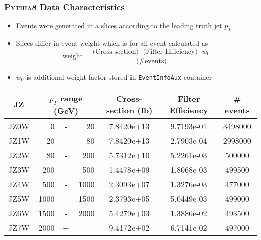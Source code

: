 \documentclass[compress]{beamer}
\newcommand{\pt}{p_{T}}
\begin{document}
\begin{frame}
\frametitle{\textsc{Pythia8} Data Characteristics}
\begin{itemize}
  \item Events were generated in a slices according to the leading truth
      jet $\pt$.
  \item Slices differ in event weight which is for all event calculated as
  \begin{equation*}
    \text{weight} = \frac{\text{(Cross-section)} \cdot \text{(Filter
      Efficiency)} \cdot w_0}{\text{(\# events)}} 
    \end{equation*}
  \item $w_0$ is additional weight factor stored in \texttt{EventInfoAux}
    container
\end{itemize}
  \small
  \begin{table}
  \centering
  \begin{tabular}{|c|rcr|c|c|c|}
    \hline 
     JZ & \multicolumn{3}{|c|}{$\pt$ range (GeV)} & Cross-section (fb) & Filter Efficiency & \# events  \\ 
    \hline
    \hline
		 JZ0W &     0 & - &    20 & 7.8420e+13 & 9.7193e-01 & 3498000 \\ 
    \hline
		 JZ1W &    20 & - &    80 & 7.8420e+13 & 2.7903e-04 & 2998000 \\
    \hline
		 JZ2W &    80 & - &   200 & 5.7312e+10 & 5.2261e-03 & 500000  \\
    \hline
		 JZ3W &   200 & - &   500 & 1.4478e+09 & 1.8068e-03 & 499500  \\
    \hline
		 JZ4W &   500 & - &  1000 & 2.3093e+07 & 1.3276e-03 & 477000  \\
    \hline
		 JZ5W &  1000 & - &  1500 & 2.3793e+05 & 5.0449e-03 & 499000  \\
    \hline
		 JZ6W &  1500 & - &  2000 & 5.4279e+03 & 1.3886e-02 & 493500  \\
    \hline
		 JZ7W &  2000 & + &       & 9.4172e+02 & 6.7141e-02 & 497000  \\
    \hline 
  \end{tabular}
\end{table}
\normalsize
\end{frame}

\begin{frame}
\frametitle{$\pt$ spectra of Truth Jets}
  \begin{figure}[H]
    \centering
    \texttt{[image: \{ptTruthAllRapidityBins]}.eps}
  \end{figure}
\end{frame}
\end{document}
